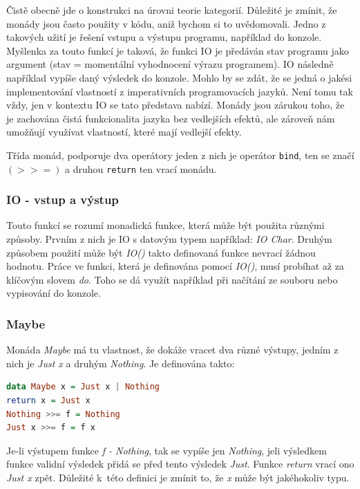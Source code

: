 \documentclass[12pt,a4paper]{report}
\begin{document}
Čistě obecně jde o konstrukci na úrovni teorie kategorií. Důležité je zmínit, že monády jsou často použity v kódu, aniž bychom si to uvědomovali. Jedno z takových užití je řešení vstupu a výstupu programu, například do konzole. Myšlenka za touto funkcí je taková, že funkci IO je předáván stav programu jako argument (stav = momentální vyhodnocení výrazu programem). IO následně například vypíše daný výsledek do konzole. Mohlo by se zdát, že se jedná o jakési implementování vlastností z imperativních programovacích jazyků. Není tomu tak vždy, jen v kontextu IO se tato představa nabízí. Monády jsou zárukou toho, že je zachována čistá funkcionalita jazyka bez vedlejších efektů, ale zároveň nám umožňují využívat vlastností, které mají vedlejší efekty. 

Třída monád, podporuje dva operátory jeden z nich je operátor \texttt{bind}, ten se značí $ (>>=) $ a druhou \texttt{return} ten vrací monádu. 
\subsubsection{IO - vstup a výstup}
Touto funkcí se rozumí monadická funkce, která může být použita různými způsoby. Prvním z nich je IO s datovým typem například: \textit{IO Char}. Druhým způsobem použití může být \textit{IO()} takto definovaná funkce nevrací žádnou hodnotu. Práce ve funkci, která je definována pomocí \textit{IO()}, musí probíhat až za klíčovým slovem \textit{do}. Toho se dá využít například při načítání ze souboru nebo vypisování do konzole.  

\subsubsection{Maybe}
Monáda \textit{Maybe} má tu vlastnost, že dokáže vracet dva různé výstupy, jedním z nich je \textit{Just x} a druhým \textit{Nothing}. Je definována takto:

\begin{lstlisting}[language=Haskell, caption={Definice Maybe}, captionpos=b,]
data Maybe x = Just x | Nothing
return x = Just x
Nothing >>= f = Nothing	
Just x >>= f = f x
\end{lstlisting}
Je-li výstupem funkce \textit{f - Nothing}, tak se vypíše jen \textit{Nothing}, jeli výsledkem funkce validní výsledek přidá se před tento výsledek \textit{Just}. Funkce \textit{return} vrací ono \textit{Just x} zpět.\cite{monady} Důležité k~této definici je zmínit to, že \textit{x} může být jakéhokoliv typu.  
\end{document}

